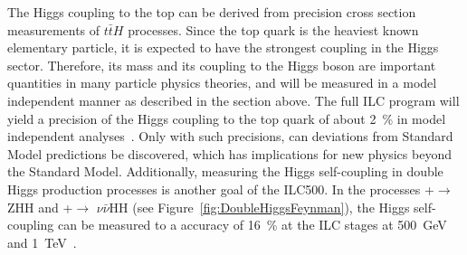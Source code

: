 The Higgs coupling to the top can be derived from precision cross section measurements of $t\bar{t}H$ processes.
Since the top quark is the heaviest known elementary particle, it is expected to have the strongest coupling in the Higgs sector.
Therefore, its mass and its coupling to the Higgs boson are important quantities in many particle physics theories, and will be measured in a model independent manner as described in the section above.
The full ILC program will yield a precision of the Higgs coupling to the top quark of about \SI{2}{\percent} in model independent analyses~\cite{ttH_coupling}.
Only with such precisions, can deviations from Standard Model predictions be discovered, which has implications for new physics beyond the Standard Model.
Additionally, measuring the Higgs self-coupling in double Higgs production processes is another goal of the ILC500.
In the processes \positron +\electron$\rightarrow$ZHH and \positron +\electron$\rightarrow$ $\nu\bar{\nu}$HH (see Figure~\ref{fig:DoubleHiggsFeynman}), the Higgs self-coupling can be measured to a accuracy of \SI{16}{\percent} at the ILC stages at \SI{500}{\GeV} and \SI{1}{\TeV}~\cite{ttH_coupling}.
